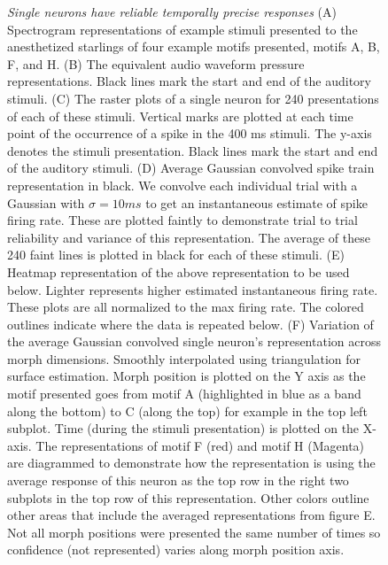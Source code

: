 \begin{figure}[tp]
 \caption[Single neurons have reliable temporally precise responses]{
 \emph{Single neurons have reliable temporally precise responses}
(A)	Spectrogram representations of example stimuli presented to the anesthetized starlings of four example motifs presented, motifs A, B, F, and H.
(B) The equivalent audio waveform pressure representations. Black lines mark the start and end of the auditory stimuli.
(C) The raster plots of a single neuron for 240 presentations of each of these stimuli. Vertical marks are plotted at each time point of the occurrence of a spike in the 400 ms stimuli. The y-axis denotes the stimuli presentation. Black lines mark the start and end of the auditory stimuli.
(D) Average Gaussian convolved spike train representation in black. We convolve each individual trial with a Gaussian with $\sigma=10ms$ to get an instantaneous estimate of spike firing rate. These are plotted faintly to demonstrate trial to trial reliability and variance of this representation. The average of these 240 faint lines is plotted in black for each of these stimuli.
(E) Heatmap representation of the above representation to be used below. Lighter represents higher estimated instantaneous firing rate. These plots are all normalized to the max firing rate. The colored outlines indicate where the data is repeated below.
(F) Variation of the average Gaussian convolved single neuron’s representation across morph dimensions. Smoothly interpolated using triangulation for surface estimation. Morph position is plotted on the Y axis as the motif presented goes from motif A (highlighted in blue as a band along the bottom) to C (along the top) for example in the top left subplot. Time (during the stimuli presentation) is plotted on the X-axis. The representations of motif F (red) and motif H (Magenta) are diagrammed to demonstrate how the representation is using the average response of this neuron as the top row in the right two subplots in the top row of this representation. Other colors outline other areas that include the averaged representations from figure E.  Not all morph positions were presented the same number of times so confidence (not represented) varies along morph position axis.
}
\end{figure}

